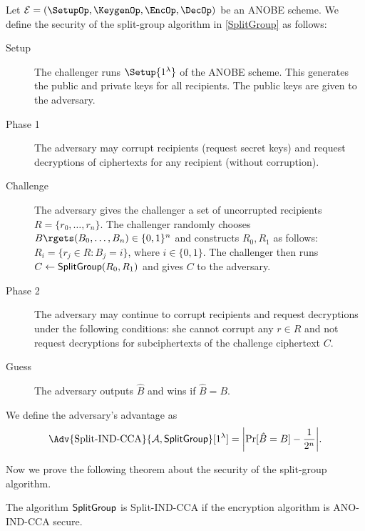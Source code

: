 \begin{definition}\label{SplitGroupSecurity}
  Let \(\mathcal{E} = (\SetupOp, \KeygenOp, \EncOp, \DecOp)\) be an \ac{ANOBE} 
  scheme.
  We define the security of the split-group algorithm in \cref{SplitGroup} as 
  follows:
  \begin{description}
    \item[Setup] The challenger runs \(\Setup{1^\lambda}\) of the \ac{ANOBE} 
      scheme.
      This generates the public and private keys for all recipients.
      The public keys are given to the adversary.

    \item[Phase 1] The adversary may corrupt recipients (request secret keys) 
      and request decryptions of ciphertexts for any recipient (without 
      corruption).

    \item[Challenge] The adversary gives the challenger a set of uncorrupted 
      recipients \(R = \{r_0, \ldots, r_n\}\).
      The challenger randomly chooses \(B\rgets (B_0, \ldots, B_n) \in \{0, 
        1\}^n\) and constructs \(R_0, R_1\) as follows:
      \(R_i = \{ r_j\in R\colon B_j = i\}\), where \(i\in \{0, 1\}\).
      The challenger then runs \(C\gets \SplitGroup[R_0, R_1]\) and gives \(C\) 
      to the adversary.

    \item[Phase 2] The adversary may continue to corrupt recipients and request 
      decryptions under the following conditions:
      she cannot corrupt any \(r\in R\) and not request decryptions for 
      subciphertexts of the challenge ciphertext \(C\).

    \item[Guess] The adversary outputs \(\hat{B}\) and wins if \(\hat{B} 
        = B\).
  \end{description}
  We define the adversary's advantage as \[\Adv{\text{Split-IND-CCA}}{\A, 
      \SplitGroupOp}[1^\lambda] = \mleft|\Pr[ \hat{B} 
    = B ] - \frac{1}{2^n}\mright|.\]
\end{definition}

Now we prove the following theorem about the security of the split-group 
algorithm.

\begin{theorem}\label{SplitGroupIsSecure}
  The algorithm \(\operatorname{\mathsf{SplitGroup}}\) is Split-IND-CCA if the encryption algorithm 
  is ANO-IND-CCA secure.
\end{theorem}

